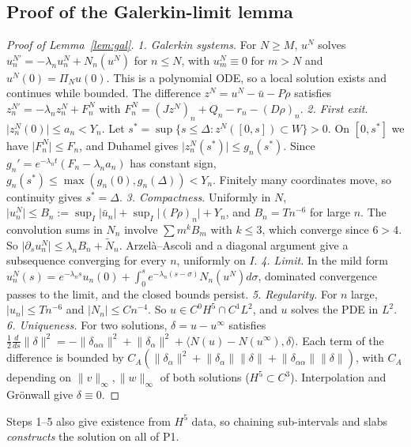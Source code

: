 \documentclass[11pt]{article}
\theoremstyle{definition}
\theoremstyle{remark}
\newcommand{\ip}[2]{\langle #1,#2\rangle}
\newcommand{\abs}[1]{\lvert #1\rvert}
\newcommand{\norm}[1]{\lVert #1\rVert}
\begin{document}
\subsection{Proof of the Galerkin-limit lemma}\label{app:gal}
\begin{proof}[Proof of Lemma~\ref{lem:gal}]
\emph{1. Galerkin systems.} For $N\ge M$, $u^N$ solves $u^{N\prime}_n=-\lambda_nu^N_n+N_n(u^N)$ for $n\le N$, with $u^N_m\equiv0$ for $m>N$ and $u^N(0)=\Pi_Nu(0)$. This is a polynomial ODE, so a local solution exists and continues while bounded. The difference $z^N=u^N-\bar u-P\rho$ satisfies $z^{N\prime}_n=-\lambda_nz^N_n+F^N_n$ with $F^N_n=(Jz^N)_n+Q_n-r_n-(D\rho)_n$.
\emph{2. First exit.} $\abs{z_n^N(0)}\le a_n<Y_n$. Let $s^*=\sup\{s\le\Delta:z^N([0,s])\subset W\}>0$. On $[0,s^*]$ we have $\abs{F_n^N}\le F_n$, and Duhamel gives $\abs{z^N_n(s^*)}\le g_n(s^*)$. Since $g_n'=e^{-\lambda_nt}(F_n-\lambda_na_n)$ has constant sign, $g_n(s^*)\le\max(g_n(0),g_n(\Delta))<Y_n$. Finitely many coordinates move, so continuity gives $s^*=\Delta$.
\emph{3. Compactness.} Uniformly in $N$, $\abs{u^N_n}\le B_n:=\sup_I\abs{\bar u_n}+\sup_I\abs{(P\rho)_n}+Y_n$, and $B_n=Tn^{-6}$ for large $n$. The convolution sums in $N_n$ involve $\sum m^kB_m$ with $k\le3$, which converge since $6>4$. So $\abs{\partial_su^N_n}\le\lambda_nB_n+\tilde N_n$. Arzel\`a--Ascoli and a diagonal argument give a subsequence converging for every $n$, uniformly on $I$.
\emph{4. Limit.} In the mild form $u_n^N(s)=e^{-\lambda_ns}u_n(0)+\int_0^se^{-\lambda_n(s-\sigma)}N_n(u^N)d\sigma$, dominated convergence passes to the limit, and the closed bounds persist.
\emph{5. Regularity.} For $n$ large, $\abs{u_n}\le Tn^{-6}$ and $\abs{N_n}\le Cn^{-4}$. So $u\in C^0H^5\cap C^1L^2$, and $u$ solves the PDE in $L^2$.
\emph{6. Uniqueness.} For two solutions, $\delta=u-u^\infty$ satisfies $\frac12\frac d{ds}\norm\delta^2=-\norm{\delta_{\alpha\alpha}}^2+\norm{\delta_\alpha}^2+\ip{N(u)-N(u^\infty)}\delta$. Each term of the difference is bounded by $C_A(\norm{\delta_\alpha}^2+\norm{\delta_\alpha}\norm\delta+\norm{\delta_{\alpha\alpha}}\norm\delta)$, with $C_A$ depending on $\norm{v}_\infty,\norm w_\infty$ of both solutions ($H^5\subset C^3$). Interpolation and Gr\"onwall give $\delta\equiv0$.
\end{proof}
\noindent Steps 1--5 also give existence from $H^5$ data, so chaining sub-intervals and slabs \emph{constructs} the solution on all of P1.
\end{document}
